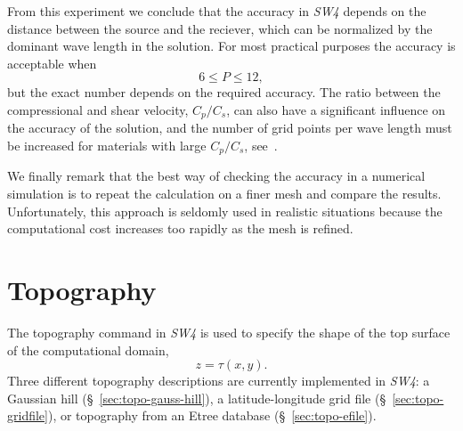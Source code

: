 \documentclass[11pt]{report}
\begin{document}
From this experiment we conclude that the accuracy in \emph{SW4} depends on the distance between the
source and the reciever, which can be normalized by the dominant wave length in the solution. For
most practical purposes the accuracy is acceptable when
\[
6 \leq P \leq 12,
\]
but the exact number depends on the required accuracy. The ratio between the compressional and shear
velocity, $C_p/C_s$, can also have a significant influence on the accuracy of the solution, and the
number of grid points per wave length must be increased for materials with large
$C_p/C_s$, see~\cite{KrePet-12}. 

We finally remark that the best way of checking the accuracy in a numerical simulation is to repeat
the calculation on a finer mesh and compare the results. Unfortunately, this approach is seldomly
used in realistic situations because the computational cost increases too rapidly as the mesh is refined.

\chapter{Topography} \label{sec:topography}

The topography command in \emph{SW4} is used to specify the shape of the top surface of the
computational domain,
\[
z=\tau(x,y).
\]
Three different topography descriptions are currently implemented in \emph{SW4}: a Gaussian hill
(\S~\ref{sec:topo-gauss-hill}), a latitude-longitude grid file (\S~\ref{sec:topo-gridfile}), or
topography from an Etree database (\S~\ref{sec:topo-efile}).
\end{document}
